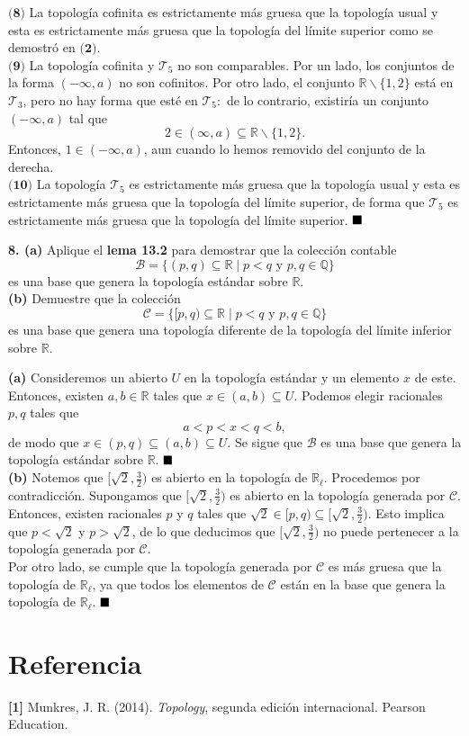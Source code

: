\documentclass{article}
\begin{document}
$\textbf{(8)}$ La topología cofinita es estrictamente más gruesa que la topología usual y esta es estrictamente más gruesa que la topología del límite superior como se demostró en $\textbf{(2)}$.\\ 
\newpage
$\textbf{(9)}$ La topología cofinita y $\mathcal{T}_{5}$ no son comparables. Por un lado, los conjuntos de la forma $(- \infty, a)$ no son cofinitos. Por otro lado, el conjunto $\mathbb{R} \backslash \{ 1, 2\}$ está en $\mathcal{T}_{3}$, pero no hay forma que esté en $\mathcal{T}_{5}: $ de lo contrario, existiría un conjunto $(-\infty, a)$ tal que
$$  2 \in (\infty, a) \subseteq \mathbb{R} \backslash \{1, 2 \}.$$ 
Entonces, $1 \in (- \infty, a)$, aun cuando lo hemos removido del conjunto de la derecha. \\

$\textbf{(10)}$ La topología $\mathcal{T}_{5}$ es estrictamente más gruesa que la topología usual y esta es estrictamente más gruesa que la topología del límite superior, de forma que $\mathcal{T}_{5}$ es estrictamente más gruesa que la topología del límite superior. $\hspace*{\fill} \blacksquare$\\
 

\begin{mybox}
\textbf{8. (a)} Aplique el \textbf{lema 13.2} para demostrar que la colección contable 
$$ \mathcal{B} = \{ (p, q) \subseteq \mathbb{R} \mid p < q \text{ y } p, q \in \mathbb{Q} \} $$
es una base que genera la topología estándar sobre $\mathbb{R}$.	\\

\textbf{(b) }Demuestre que la colección 
$$ \mathcal{C} = \{ [p, q) \subseteq \mathbb{R} \mid p < q \text{ y }p, q \in \mathbb{Q} \} $$
es una base que genera una topología diferente de la topología del límite inferior sobre $\mathbb{R}$.
\end{mybox}	

\textbf{(a)} Consideremos un abierto $U$ en la topología estándar y un elemento $x$ de este. Entonces, existen $a, b \in \mathbb{R}$ tales que $x \in (a, b) \subseteq U$. Podemos elegir racionales $p, q$ tales que 
$$ a < p < x < q < b ,$$
de modo que $x \in (p, q) \subseteq (a, b ) \subseteq U.$ Se sigue que $\mathcal{B}$ es una base que genera la topología estándar sobre $\mathbb{R}$. $\hspace*{\fill} \blacksquare$\\

\textbf{(b) } Notemos que $[\sqrt{2}, \frac{3}{2})$ es abierto en la topología de $\mathbb{R}_{\ell}$. Procedemos por contradicción. Supongamos que $[\sqrt{2}, \frac{3}{2})$ es abierto en la topología generada por $\mathcal{C}$. Entonces, existen racionales $p$ y $q$ tales que $\sqrt{2} \in [p, q) \subseteq [\sqrt{2}, \frac{3}{2})$. Esto implica que $p < \sqrt{2}$ y $p > \sqrt{2}$, de lo que deducimos que $[\sqrt{2}, \frac{3}{2})$ no puede pertenecer a la topología generada por $\mathcal{C}$. \\
Por otro lado, se cumple que la topología generada por $\mathcal{C}$ es más gruesa que la topología de $\mathbb{R}_{\ell}$, ya que todos los elementos de $\mathcal{C}$ están en la base que genera la topología de $\mathbb{R}_{\ell}$. $\hspace*{\fill} \blacksquare$
\section*{Referencia}
\textbf{[1]} Munkres, J. R. (2014). \textit{Topology}, segunda edición internacional. Pearson Education. 
\end{document}
